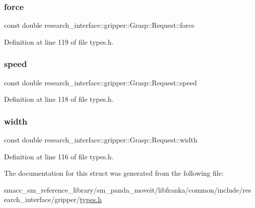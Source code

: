 \subsubsection{\texorpdfstring{force}{force}}
{\footnotesize\ttfamily const double research\+\_\+interface\+::gripper\+::\+Grasp\+::\+Request\+::force}



Definition at line 119 of file types.\+h.

\mbox{\label{structresearch__interface_1_1gripper_1_1Grasp_1_1Request_aa884e08fa60588e53d8d38e3c997e12c}} 
\subsubsection{\texorpdfstring{speed}{speed}}
{\footnotesize\ttfamily const double research\+\_\+interface\+::gripper\+::\+Grasp\+::\+Request\+::speed}



Definition at line 118 of file types.\+h.

\mbox{\label{structresearch__interface_1_1gripper_1_1Grasp_1_1Request_adfb3ab33666b84558acf209f5c3ee5b5}} 
\subsubsection{\texorpdfstring{width}{width}}
{\footnotesize\ttfamily const double research\+\_\+interface\+::gripper\+::\+Grasp\+::\+Request\+::width}



Definition at line 116 of file types.\+h.



The documentation for this struct was generated from the following file\+:\begin{DoxyCompactItemize}
\item 
smacc\+\_\+sm\+\_\+reference\+\_\+library/sm\+\_\+panda\+\_\+moveit/libfranka/common/include/research\+\_\+interface/gripper/\hyperlink{types_8h}{types.\+h}\end{DoxyCompactItemize}
